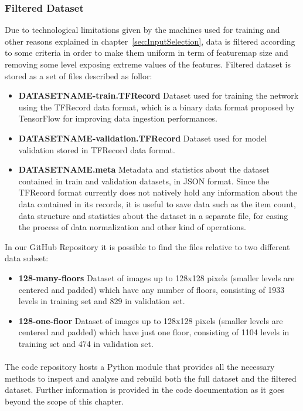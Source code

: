  \subsubsection{Filtered Dataset} Due to technological limitations given by the machines used for training and other reasons explained in chapter~\ref{sec:InputSelection}, data is filtered according to some criteria in order to make them uniform in term of \gls{featuremap} size and removing some level exposing extreme values of the features. Filtered dataset is stored as a set of files described as follor:
 	\begin{itemize}
		\item \textbf{DATASETNAME-train.TFRecord} Dataset used for training the network using the TFRecord data format, which is a binary data format proposed by TensorFlow for improving data ingestion performances. 
		\item \textbf{DATASETNAME-validation.TFRecord}  Dataset used for model validation stored in TFRecord data format.
		\item \textbf{DATASETNAME.meta} Metadata and statistics about the dataset contained in train and validation datasets, in JSON format. Since the TFRecord format currently does not natively hold any information about the data contained in its records, it is useful to save data such as the item count, data structure and statistics about the dataset in a separate file, for easing the process of data normalization and other kind of operations.
 	\end{itemize}
 \label{sec:metadata_tfrecord}
 
 In our GitHub Repository \cite{gitrepo} it is possible to find the files relative to two different data subset:
 \begin{itemize}
 	\item \textbf{128-many-floors} Dataset of images up to 128x128 pixels (smaller levels are centered and padded) which have any number of floors, consisting of 1933 levels in training set and 829 in validation set. 
 	\item \textbf{128-one-floor} Dataset of images up to 128x128 pixels (smaller levels are centered and padded) which have just one floor, consisting of 1104 levels in training set and 474 in validation set.
 	
 \end{itemize}
	\paragraph{} The code repository \cite{gitrepo} hosts a Python module that provides all the necessary methods to inspect and analyse and rebuild both the full dataset and the filtered dataset. Further information is provided in the code documentation as it goes beyond the scope of this chapter.
	
